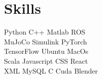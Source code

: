 \documentclass[]{deedy-resume}
\begin{document}
\begin{minipage}[t]{0.33\textwidth}


\section{Skills}
Python \textbullet{} C++ \textbullet{} Matlab \textbullet{} ROS \\
MuJoCo \textbullet{} Simulink \textbullet{} PyTorch \\
TensorFlow \textbullet{}  Ubuntu \textbullet{} MacOs  \\
Scala \textbullet{} Javascript \textbullet{} CSS \textbullet{} React \\ 
XML  \textbullet{}   
MySQL \textbullet{} C \textbullet{} Cuda \textbullet{} Blender \\    
\sectionsep



%
%

\end{minipage} 
\hfill
\end{document}
